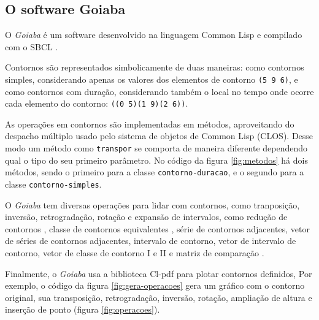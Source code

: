 \documentclass{sciposter}
\newcommand{\goiaba}[1]{\textit{Goiaba}}
\newcommand{\code}[1]{\texttt{#1}}
\begin{document}
\begin{multicols}{3}
\section{O software Goiaba}

O \goiaba{} é um software desenvolvido na linguagem Common Lisp
\cite{graham94:lisp} e compilado com o SBCL \cite{team07:sbcl}.

Contornos são representados simbolicamente de duas maneiras: como
contornos simples, considerando apenas os valores dos elementos de
contorno \code{(5 9 6)}, e como contornos com duração, considerando
também o local no tempo onde ocorre cada elemento do contorno:
\code{((0 5)(1 9)(2 6))}.

As operações em contornos são implementadas em métodos, aproveitando
do despacho múltiplo usado pelo sistema de objetos de Common Lisp
(CLOS). Desse modo um método como \texttt{transpor} se comporta de
maneira diferente dependendo qual o tipo do seu primeiro parâmetro. No
código da figura \ref{fig:metodos} há dois métodos, sendo o primeiro
para a classe \code{contorno-duracao}, e o segundo para a classe
\code{contorno-simples}.

O \goiaba{} tem diversas operações para lidar com contornos, como
tranposição, inversão, retrogradação, rotação e expansão de
intervalos, como redução de contornos \cite{adams76:melodic}, classe
de contornos equivalentes , série de contornos adjacentes, vetor de
séries de contornos adjacentes, intervalo de contorno, vetor de
intervalo de contorno, vetor de classe de contorno I e II
\cite{friedmann85:methodology} e matriz de comparação
\cite{morris93:directions}.

Finalmente, o \goiaba{} usa a biblioteca Cl-pdf para plotar contornos
definidos, Por exemplo, o código da figura \ref{fig:gera-operacoes}
gera um gráfico com o contorno original, sua transposição,
retrogradação, inversão, rotação, ampliação de altura e inserção de
ponto (figura \ref{fig:operacoes}).

\end{multicols}
\end{document}
